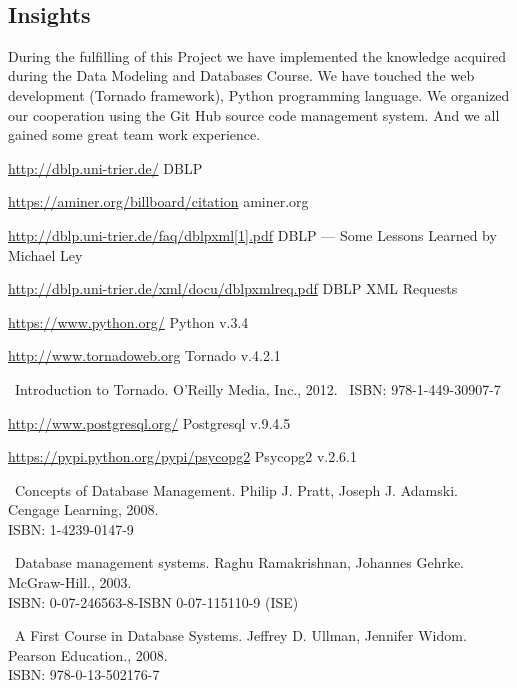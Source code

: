 \documentclass{article}
\begin{document}
~
\\

\newpage
\subsection{Insights}

During the fulfilling of this Project we have implemented the knowledge acquired during the Data Modeling and Databases Course. We have touched the web development (Tornado framework), Python programming language. We organized our cooperation using the Git Hub source code management system. And we all gained some great team work experience.



\newpage
\begin{thebibliography}{1}

\url{http://dblp.uni-trier.de/} DBLP

\url{https://aminer.org/billboard/citation} aminer.org

\url{http://dblp.uni-trier.de/faq/dblpxml[1].pdf} DBLP — Some Lessons Learned by Michael Ley

\url{http://dblp.uni-trier.de/xml/docu/dblpxmlreq.pdf} DBLP XML Requests


\url{https://www.python.org/} Python v.3.4

\url{http://www.tornadoweb.org} Tornado v.4.2.1

\ Introduction to Tornado. O’Reilly Media, Inc., 2012. \ ISBN: 978-1-449-30907-7

\url{http://www.postgresql.org/} Postgresql v.9.4.5

\url{https://pypi.python.org/pypi/psycopg2} Psycopg2 v.2.6.1



\ Concepts of Database Management. Philip J. Pratt, Joseph J. Adamski. Cengage Learning, 2008. \\ ISBN: 1-4239-0147-9

\ Database management systems. Raghu Ramakrishnan, Johannes Gehrke. McGraw-Hill., 2003. \\ ISBN: 0-07-246563-8-ISBN 0-07-115110-9 (ISE)

\ A First Course in Database Systems. Jeffrey D. Ullman, Jennifer Widom. Pearson Education., 2008. \\ ISBN: 978-0-13-502176-7






\end{thebibliography}
\end{document}

